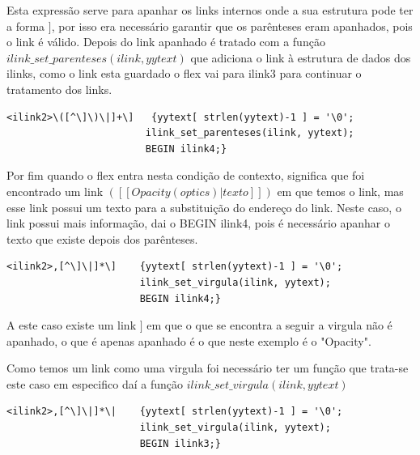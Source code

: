 \documentclass[11pt, a4paper, oneside]{article}
\begin{document}
Esta expressão serve para apanhar os links internos onde a sua estrutura pode ter a forma \begin{math}[[Opacity ((optics|]]\end{math}, por isso era necessário garantir que os parênteses eram apanhados, pois o link é válido. 
Depois do link apanhado é tratado com a função \begin{math} ilink\_set\_parenteses(ilink, yytext)\end{math} que adiciona o link à estrutura de dados dos ilinks, como o link esta guardado o flex vai para ilink3 para continuar o tratamento dos links.

\begin{verbatim}
<ilink2>\([^\]\)\|]+\]   {yytext[ strlen(yytext)-1 ] = '\0';
                        ilink_set_parenteses(ilink, yytext);
                        BEGIN ilink4;}
\end{verbatim}
Por fim quando o flex entra nesta condição de contexto, significa que foi encontrado um link \begin{math}([[Opacity (optics)|texto]])\end{math} em que temos o link, mas esse link possui um texto para a substituição do endereço do link.
Neste caso, o link possui mais informação, dai o BEGIN ilink4, pois é necessário apanhar o texto que existe depois dos parênteses.

\begin{verbatim}
<ilink2>,[^\]\|]*\]    {yytext[ strlen(yytext)-1 ] = '\0';
                       ilink_set_virgula(ilink, yytext);
                       BEGIN ilink4;}
\end{verbatim}
A este caso existe um link \begin{math}[[Opacity, texto apanhar ]]\end{math} em que o que se encontra a seguir a virgula não é apanhado, o que é apenas apanhado é o que neste exemplo é o "Opacity".

Como temos um link como uma virgula foi necessário ter um função que trata-se este caso em especifico daí a função \begin{math} ilink\_set\_virgula(ilink, yytext)\end{math}

\begin{verbatim}
<ilink2>,[^\]\|]*\|    {yytext[ strlen(yytext)-1 ] = '\0';
                       ilink_set_virgula(ilink, yytext);
                       BEGIN ilink3;}
\end{verbatim}
\end{document}
